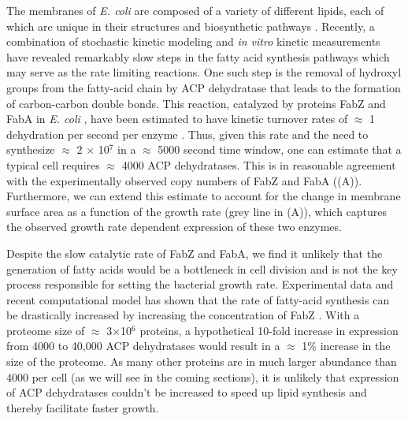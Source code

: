 The membranes of \textit{E. coli} are composed of a variety of different lipids,
each of which are unique in their structures and biosynthetic pathways
\citep{sohlenkamp2016}. Recently, a combination of stochastic kinetic modeling \citep{ruppe2018} and
\textit{in vitro} kinetic measurements \citep{ranganathan2012, yu2011} have
revealed remarkably slow steps in the fatty acid synthesis pathways which may
serve as the rate limiting reactions. One such step is the removal of hydroxyl
groups from the fatty-acid chain by ACP dehydratase that leads to the formation of
carbon-carbon double bonds. This reaction, catalyzed by proteins FabZ and
FabA in \textit{E. coli} \citep{yu2011}, have been estimated to have kinetic
turnover rates of $\approx$ 1 dehydration per second per enzyme
\citep{ruppe2018}. Thus, given this rate and the need to synthesize $\approx$
2 $\times$ 10$^7$ in a $\approx$ 5000 second time window, one can estimate that
a typical cell requires $\approx$ 4000 ACP dehydratases. This is in
reasonable agreement with the experimentally observed copy numbers of FabZ and
FabA ((A)). Furthermore, we can extend this estimate to
account for the change in membrane surface area as a function of the growth rate
(grey line in (A)), which captures the observed growth rate
dependent expression of these two enzymes.

Despite the slow catalytic rate of FabZ and FabA, we find it unlikely that
the generation of fatty acids would be a bottleneck in cell division and is
not the key process responsible for setting the bacterial growth rate.
Experimental data and recent computational model has shown that the rate of
fatty-acid synthesis can be drastically increased by increasing the
concentration of FabZ \cite{yu2011, ruppe2018}. With a proteome size of
$\approx$ 3$\times$10$^6$ proteins, a hypothetical 10-fold increase in
expression from 4000 to 40,000 ACP dehydratases would result in a $\approx$
1\% increase in the size of the proteome. As many other proteins are in much
larger abundance than 4000 per cell (as we will see in the coming sections),
it is unlikely that expression of ACP dehydratases couldn't be increased to
speed up lipid synthesis and thereby facilitate faster growth.

